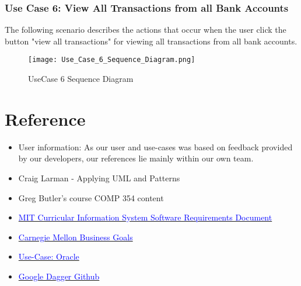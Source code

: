 \documentclass[12pt]{article}
\begin{document}
\clearpage

\clearpage

\subsubsection{Use Case 6: View All Transactions from all Bank Accounts}

The following scenario describes the actions that occur when the user click the button "view all transactions" for viewing all transactions from all bank accounts.

\begin{figure}[H]
\texttt{[image: Use\_Case\_6\_Sequence\_Diagram.png]}
\caption{UseCase 6 Sequence Diagram}
\label{fig:use-case-6-sequence-diagram}
\end{figure}

\clearpage

\section{Reference}

\begin{itemize}
\item User information: As our user and use-cases was based on feedback provided by our developers, our references lie mainly within our own team.
\item Craig Larman - Applying UML and Patterns
\item Greg Butler's course COMP 354 content
\item \href{http://web.mit.edu/ssit/cis/CISRequirements.html}{\textcolor{blue}{MIT Curricular Information System
Software Requirements Document}}
\item \href{https://resources.sei.cmu.edu/asset_files/TechnicalReport/2005_005_001_14621.pdf}{\textcolor{blue}{Carnegie Mellon Business Goals}}
\item \href{http://www.oracle.com/technetwork/testcontent/gettingstartedwithusecasemodeling-133857.pdf}{\textcolor{blue}{Use-Case: Oracle }}
\item \href{https://github.com/google/dagger}{\textcolor{blue}{Google Dagger Github}}

\end{itemize}
\end{document}
